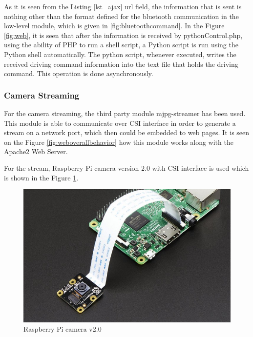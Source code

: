 \newpage


As it is seen from the Listing \ref{lst_ajax} url field, the information that is sent is nothing other than the format defined for the bluetooth communication in the low-level module, which is given in \ref{fig:bluetoothcommand}. In the Figure \ref{fig:web}, it is seen that after the information is received by pythonControl.php, using the ability of PHP to run a shell script, a Python script is run using the Python shell automatically. The python script, whenever executed, writes the received driving command information into the text file that holds the driving command. This operation is done asynchronously. 
\subsubsection{Camera Streaming}
For the camera streaming, the third party module mjpg-streamer \cite{mjpgstreamergithub} has been used. This module is able to communicate over CSI interface in order to generate a stream on a network port, which then could be embedded to web pages. It is seen on the Figure \ref{fig:weboverallbehavior} how this module works along with the Apache2 Web Server. 

For the stream, Raspberry Pi camera version 2.0 with CSI interface is used which is shown in the Figure \ref{fig:rpicam20}.

\begin{figure}[!ht]
	\centering
	\includegraphics[scale=0.5]{content/images/rpicam20.jpg}
	\caption{Raspberry Pi camera v2.0}
	\label{fig:rpicam20}
\end{figure}

